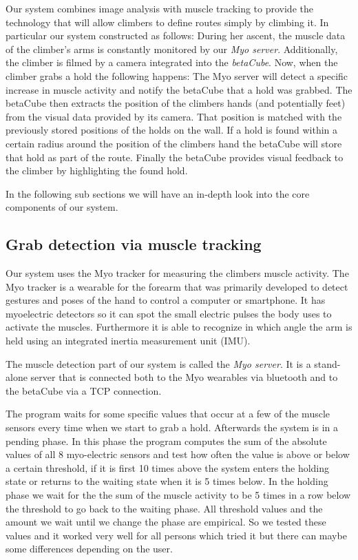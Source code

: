 Our system combines image analysis with muscle tracking to provide the technology that will allow climbers to define routes simply by climbing it.
In particular our system constructed as follows:
During her ascent, the muscle data of the climber's arms is constantly monitored by our \emph{Myo server}.
Additionally, the climber is filmed by a camera integrated into the \emph{betaCube}.
Now, when the climber grabs a hold the following happens:
The Myo server will detect a specific increase in muscle activity and notify the betaCube that a hold was grabbed.
The betaCube then extracts the position of the climbers hands (and potentially feet) from the visual data provided by its camera.
That position is matched with the previously stored positions of the holds on the wall.
If a hold is found within a certain radius around the position of the climbers hand the betaCube will store that hold as part of the route.
Finally the betaCube provides visual feedback to the climber by highlighting the found hold.

In the following sub sections we will have an in-depth look into the core components of our system.

\subsection{Grab detection via muscle tracking}
Our system uses the Myo tracker for measuring the climbers muscle activity.
The Myo tracker is a wearable for the forearm that was primarily developed to detect gestures and poses of the hand to control a computer or smartphone.
It has myoelectric detectors so it can spot the small electric pulses the body uses to activate the muscles.
Furthermore it is able to recognize in which angle the arm is held using an integrated inertia measurement unit (IMU).

The muscle detection part of our system is called the \emph{Myo server}.
It is a stand-alone server that is connected both to the Myo wearables via bluetooth and to the betaCube via a TCP connection.

The program waits for some specific values that occur at a few of the muscle sensors every time when we start to grab a hold.
Afterwards the system is in a pending phase.
In this phase the program computes the sum of the absolute values of all 8 myo-electric sensors and test how often the value is above or below a certain threshold, if it is first 10 times above the system enters the holding state or returns to the waiting state when it is 5 times below.
In the holding phase we wait for the the sum of the muscle activity to be 5 times in a row below the threshold to go back to the waiting phase.
All threshold values and the amount we wait until we change the phase are empirical.
So we tested these values and it worked very well for all persons which tried it but there can maybe some differences depending on the user.


